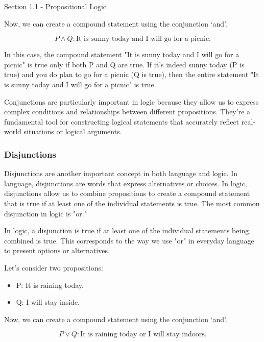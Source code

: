 \begin{notes}{Section 1.1 - Propositional Logic}
\begin{Highlight}
        Now, we can create a compound statement using the conjunction `and'.

        \begin{equation}
            P \wedge Q: \text{It is sunny today and I will go for a picnic.}
        \end{equation}

        In this case, the compound statement "It is sunny today and I will go for a picnic" is true only if both P and Q are true. If it's indeed sunny today (P is true) and you do plan to go for a picnic 
        (Q is true), then the entire statement "It is sunny today and I will go for a picnic" is true.
    \end{Highlight}

    Conjunctions are particularly important in logic because they allow us to express complex conditions and relationships between different propositions. They're a fundamental tool for constructing logical 
    statements that accurately reflect real-world situations or logical arguments.

    \subsubsection*{Disjunctions}

    Disjunctions are another important concept in both language and logic. In language, disjunctions are words that express alternatives or choices. In logic, disjunctions allow us to combine propositions to 
    create a compound statement that is true if at least one of the individual statements is true. The most common disjunction in logic is "or."

    In logic, a disjunction is true if at least one of the individual statements being combined is true. This corresponds to the way we use "or" in everyday language to present options or alternatives.

    \begin{Highlight}
        Let's consider two propositions:

        \begin{itemize}
            \item P: It is raining today.
            \item Q: I will stay inside.
        \end{itemize}

        Now, we can create a compound statement using the conjunction `and'.

        \begin{equation}
            P \vee Q: \text{It is raining today or I will stay indoors.}
        \end{equation}


\end{Highlight}
\end{notes}

